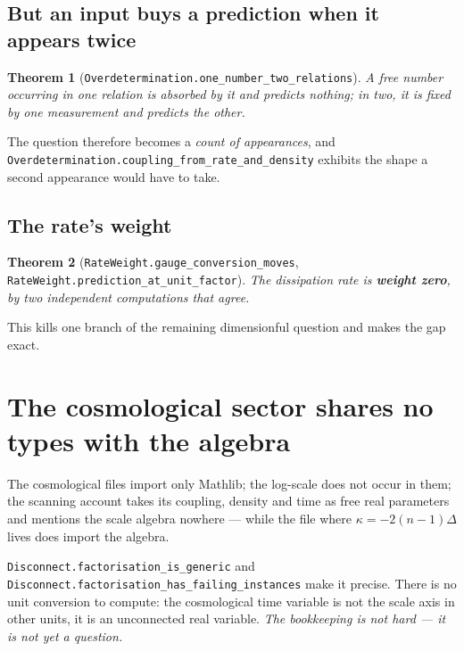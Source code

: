 \documentclass[11pt,a4paper]{article}
\newtheorem{theorem}{Theorem}[section]
\theoremstyle{definition}
\theoremstyle{remark}
\newcommand{\lean}[1]{\texttt{\small #1}}
\begin{document}
\subsection{But an input buys a prediction when it appears twice}

\begin{theorem}[\lean{Overdetermination.one\_number\_two\_relations}]
A free number occurring in one relation is absorbed by it and predicts nothing; in
two, it is fixed by one measurement and predicts the other.
\end{theorem}

The question therefore becomes a \emph{count of appearances}, and
\lean{Overdetermination.coupling\_from\_rate\_and\_density} exhibits the shape a
second appearance would have to take.

\subsection{The rate's weight}

\begin{theorem}[\lean{RateWeight.gauge\_conversion\_moves},
\lean{RateWeight.prediction\_at\_unit\_factor}]
The dissipation rate is \textbf{weight zero}, by two independent computations that
agree.
\end{theorem}

This kills one branch of the remaining dimensionful question and makes the gap
exact.

\section{The cosmological sector shares no types with the algebra}
\label{sec:disconnect}

\begin{claimbox}
The cosmological files import only Mathlib; the log-scale does not occur in them;
the scanning account takes its coupling, density and time as free real parameters
and mentions the scale algebra nowhere --- while the file where
$\kappa=-2(n-1)\Delta$ lives does import the algebra.
\end{claimbox}

\lean{Disconnect.factorisation\_is\_generic} and
\lean{Disconnect.factorisation\_has\_failing\_instances} make it precise. There is
no unit conversion to compute: the cosmological time variable is not the scale axis
in other units, it is an unconnected real variable. \emph{The bookkeeping is not
hard --- it is not yet a question.}
\end{document}
